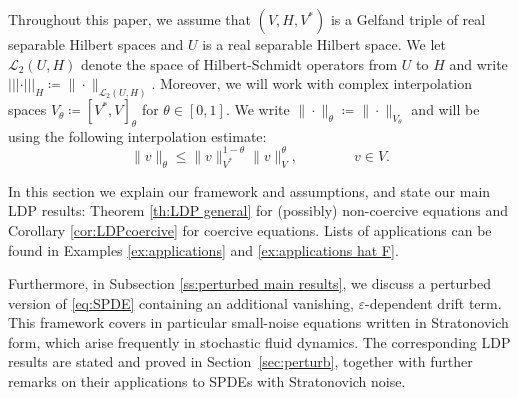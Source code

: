 \documentclass{amsart}
\newcommand{\<}{\langle}
\newcommand{\?}{\rangle}
\newcommand{\nn}{|\!|\!|}
\newcommand{\ceqq}{\coloneqq}
\theoremstyle{plain}
\theoremstyle{remark}
\theoremstyle{plain}
\numberwithin{equation}{section}
\newcommand{\eps}{\varepsilon}
\begin{document}
Throughout this paper, we assume that $(V,H,V^*)$ is a Gelfand triple of real separable Hilbert spaces and $U$ is a real separable Hilbert space. We let $\mathscr{L}_2(U,H)$ denote the space of Hilbert-Schmidt operators from $U$ to $H$ and write $\nn\cdot\nn_H\ceqq \|\cdot\|_{\mathscr{L}_2(U,H)}$. Moreover, we will work with complex interpolation spaces  $V_\theta\ceqq [V^*,V]_\theta$ for $\theta\in[0,1]$. We  write  $\|\cdot\|_{\theta}\ceqq \|\cdot\|_{V_\theta}$ and will be using the following interpolation estimate:
\begin{equation}\label{eq: interpol est}
  \|v\|_{\theta}\leq \|v\|_{V^*}^{1-\theta}\|v\|_{V}^\theta, \qquad\qquad v\in V. 
\end{equation}

In this section we explain our framework and assumptions, and state our main LDP results: Theorem \ref{th:LDP general}  for (possibly) non-coercive equations and Corollary \ref{cor:LDPcoercive}  for coercive equations. Lists of  applications can be found in Examples \ref{ex:applications} and \ref{ex:applications hat F}.  


Furthermore, in Subsection \ref{ss:perturbed main results}, we discuss a perturbed version of \eqref{eq:SPDE} containing an additional vanishing, $\eps$-dependent drift term. This framework covers  in particular small-noise equations written in Stratonovich form, which arise frequently in stochastic fluid dynamics. The corresponding LDP results are stated and proved in Section~\ref{sec:perturb}, together with further remarks on their applications to SPDEs with Stratonovich
noise.
\end{document}
